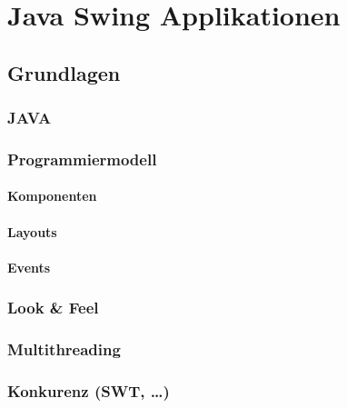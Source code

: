 \documentclass[
11pt, %
a4paper, %
BCOR25mm, %
DIV14, %
footsepline = false, %
headsepline, %
twoside, %
openright,
abstracton, %
listof=totocnumbered, %
bibliography=totocnumbered %
]{scrreprt}
\begin{document}
  
  \chapter{Java Swing Applikationen}

  \section{Grundlagen}
  
  \subsection{JAVA}
  
  \subsection{Programmiermodell}
  
  \subsubsection{Komponenten}
  
  \subsubsection{Layouts}
    
  \subsubsection{Events}
  
  \subsection{Look \& Feel}
  
  \subsection{Multithreading}
  
  \subsection{Konkurenz (SWT, \ldots)}

  \cleardoublepage
   
\end{document}
